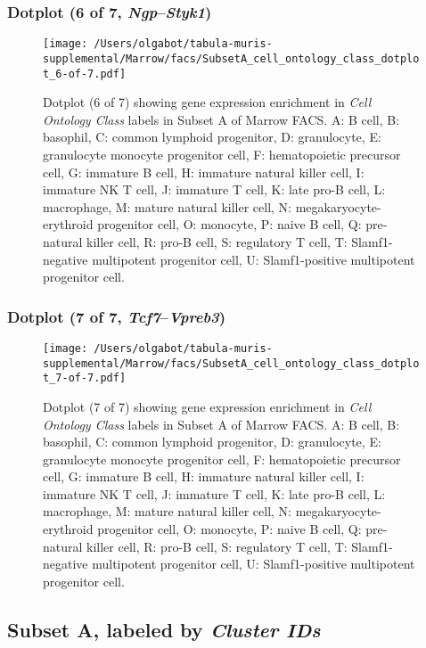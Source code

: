 \subsubsection{Dotplot (6 of 7, \emph{Ngp}--\emph{Styk1})}
\begin{figure}[h]
\centering
\texttt{[image: /Users/olgabot/tabula-muris-supplemental/Marrow/facs/SubsetA\_cell\_ontology\_class\_dotplot\_6-of-7.pdf]}

\caption{ Dotplot (6 of 7)  showing gene expression enrichment in \emph{Cell Ontology Class} labels in Subset A of Marrow FACS. A: B cell, B: basophil, C: common lymphoid progenitor, D: granulocyte, E: granulocyte monocyte progenitor cell, F: hematopoietic precursor cell, G: immature B cell, H: immature natural killer cell, I: immature NK T cell, J: immature T cell, K: late pro-B cell, L: macrophage, M: mature natural killer cell, N: megakaryocyte-erythroid progenitor cell, O: monocyte, P: naive B cell, Q: pre-natural killer cell, R: pro-B cell, S: regulatory T cell, T: Slamf1-negative multipotent progenitor cell, U: Slamf1-positive multipotent progenitor cell.}
\end{figure}


\clearpage

\subsubsection{Dotplot (7 of 7, \emph{Tcf7}--\emph{Vpreb3})}
\begin{figure}[h]
\centering
\texttt{[image: /Users/olgabot/tabula-muris-supplemental/Marrow/facs/SubsetA\_cell\_ontology\_class\_dotplot\_7-of-7.pdf]}

\caption{ Dotplot (7 of 7)  showing gene expression enrichment in \emph{Cell Ontology Class} labels in Subset A of Marrow FACS. A: B cell, B: basophil, C: common lymphoid progenitor, D: granulocyte, E: granulocyte monocyte progenitor cell, F: hematopoietic precursor cell, G: immature B cell, H: immature natural killer cell, I: immature NK T cell, J: immature T cell, K: late pro-B cell, L: macrophage, M: mature natural killer cell, N: megakaryocyte-erythroid progenitor cell, O: monocyte, P: naive B cell, Q: pre-natural killer cell, R: pro-B cell, S: regulatory T cell, T: Slamf1-negative multipotent progenitor cell, U: Slamf1-positive multipotent progenitor cell.}
\end{figure}


\clearpage

\subsection{Subset A, labeled by \emph{Cluster IDs}}
